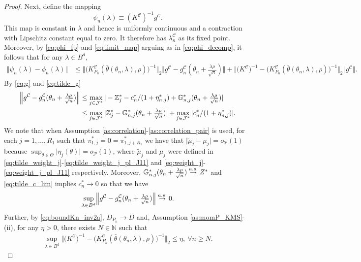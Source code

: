 \documentclass[letterpaper,11pt]{article}
\theoremstyle{myplain}
\theoremstyle{mydefinition}
\theoremstyle{myremark}
\newcommand{\G}{\mathbb{G}}
\newcommand{\HH}{\mathbb{Z}}
\newcommand{\cC}{\mathcal{C}}
\newcommand{\cJ}{\mathcal{J}}
\newcommand{\cP}{\mathcal{P}}
\newcommand{\larhon}{\frac{\lambda \rho }{\sqrt n}}
\newcommand{\tlarhon}{\tfrac{\lambda \rho }{\sqrt n}}
\numberwithin{equation}{section}
\numberwithin{figure}{section}
\begin{document}
\begin{appendices}
\begin{proof}
Next, define the mapping
\begin{equation}
\psi_{n}(\lambda) \equiv \left( K^{\cC} \right)^{-1}g^{\cC}. \label{eq:limit_map}
\end{equation}
This map is constant in $\lambda$ and hence is uniformly continuous and a contraction with Lipschitz constant equal to zero. It therefore has $\lambda^{\cC}_{n}$ as its fixed point. Moreover, by \eqref{eq:phi_fp} and \eqref{eq:limit_map} arguing as in \eqref{eq:phi_decomp}, it follows that for any $\lambda\in B^d$,
\begin{align}
\Vert \psi_{n}(\lambda) -\phi_{n}(\lambda)\Vert&\le 	\Big\Vert \big(K_{P_{n}}^{\cC}(\bar\theta(\theta_{n},\lambda),\rho )\big)^{-1} \Big\Vert_2 \Big\Vert g^{\cC}- g^{\cC}_{n}(\theta_{n}+\tlarhon) \Big\Vert 
+\Big\Vert \big(K^{\cC}\big)^{-1}- \big(K_{P_{n}}^{\cC}(\bar\theta(\theta_{n},\lambda),\rho )\big)^{-1}\Big\Vert_2 \big\Vert g^{\cC} \big\Vert.
\end{align}
By \eqref{eq:g} and \eqref{eq:tilde_g} 
\begin{align}
 \Big\Vert g^{\cC}- g^{\cC}_{n}(\theta_{n}+\tlarhon) \Big\Vert
 &\le \max_{j \in \cJ^*}|- \HH_j^*-c^{*}_{n}/(1+\eta^*_{n,j})+\G^*_{n,j}(\theta_{n}+\tlarhon)|\notag\\
 &\le \max_{j \in \cJ^*}|\HH_j^* -\G^*_{n,j}(\theta_{n}+\tlarhon)|+\max_{j \in \cJ^*}|c^{*}_{n}/(1+\eta^*_{n,j})|.\label{eq:psiphi1}
\end{align}
We note that when Assumption \ref{as:correlation}-\ref{as:correlation_pair} is used, for each $j=1,\dots,R_1$ such that $\pi^*_{1,j}=0=\pi^*_{1,j+R_1}$ we have that $\vert \tilde{\mu}_j -\mu_j \vert = o_\cP(1)$ because $\sup_{\theta \in \Theta}\vert\eta_j(\theta)\vert=o_\cP(1)$, where $\tilde{\mu}_j $ and $\mu_j$ were defined in \eqref{eq:tilde_weight_j}-\eqref{eq:tilde_weight_j_pl_J11} and \eqref{eq:weight_j}-\eqref{eq:weight_j_pl_J11} respectively.
Moreover,  $\G^*_{n,j}(\theta_{n}+\larhon)\stackrel{a.s.}{\to}\mathbb \HH^*$  and \eqref{eq:tilde_c_lim} implies $c^{*}_{n} \to 0$ so that we have 
\begin{align}
\sup_{\lambda\in B^d} \Bigl\Vert g^{\cC}- g^{\cC}_{n}(\theta_{n}+\tlarhon) \Bigr\Vert\stackrel{a.s.}{\to}0.	\label{eq:psiphi2}
\end{align}
Further, by \eqref{eq:boundKn_inv2a}, $D_{P_n}\to D$ and, Assumption \ref{as:momP_KMS}-(ii), for any $\eta>0$, there exists $N\in\mathbb N$ such that
\begin{align}
\sup_{\lambda\in B^d}	\Big\Vert \big(K^{\cC}\big)^{-1}- \big(K_{P_{n}}^{\cC}(\bar\theta(\theta_{n},\lambda),\rho )\big)^{-1}\Big\Vert_2 \le \eta,~\forall n\ge N.\label{eq:psiphi3}

\end{align}
\end{proof}
\end{appendices}
\end{document}
